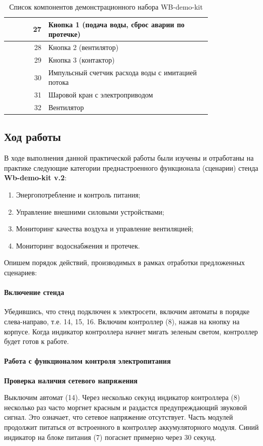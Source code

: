 \documentclass[a4paper,14pt]{extarticle}
\begin{document}
\begin{center}
\begin{table}[htbp]
\begin{tabular}{|r|p{0.8\linewidth}|}
		27 & Кнопка 1 (подача воды, сброс аварии по протечке) \\ \hline
		28 & Кнопка 2 (вентилятор) \\ \hline
		29 & Кнопка 3 (контактор) \\ \hline
		30 & Импульсный счетчик расхода воды с имитацией потока \\ \hline
		31 & Шаровой кран с электроприводом \\ \hline
		32 & Вентилятор \\ \hline
	\end{tabular}
    \caption{Список компонентов демонстрационного набора WB-demo-kit}
	\label{tab:device-list}
\end{table}
\end{center}

	
\subsection{Ход работы}
В ходе выполнения данной практической работы были изучены и отработаны на практике следующие категории преднастроенного функционала (сценарии) стенда \textbf{Wb-demo-kit v.2}:
\begin{enumerate}
	\item Энергопотребление и контроль питания;
	\item Управление внешними силовыми устройствами;
	\item Мониторинг качества воздуха и управление вентиляцией;
	\item Мониторинг водоснабжения и протечек.
\end{enumerate}
Опишем порядок действий, производимых в рамках отработки предложенных сценариев:
\paragraph*{Включение стенда}
Убедившись, что стенд подключен к электросети, включим автоматы в порядке слева-направо, т.е. 14, 15, 16.
Включим контроллер (8), нажав на кнопку на корпусе. Когда индикатор контроллера
начнет мигать зеленым светом, контроллер будет готов к работе.
\paragraph*{Работа с функционалом контроля электропитания}
	\script \textbf{Проверка наличия сетевого напряжения}
	
	Выключим автомат (14). Через несколько секунд индикатор контроллера (8) несколько раз
	часто моргнет красным и раздастся предупреждающий звуковой сигнал. Это означает, что
	сетевое напряжение отсутствует. Часть модулей продолжит питаться от встроенного в
	контроллер аккумуляторного модуля. Синий индикатор на блоке питания (7) погаснет
	примерно через 30 секунд.
	
\end{document}
